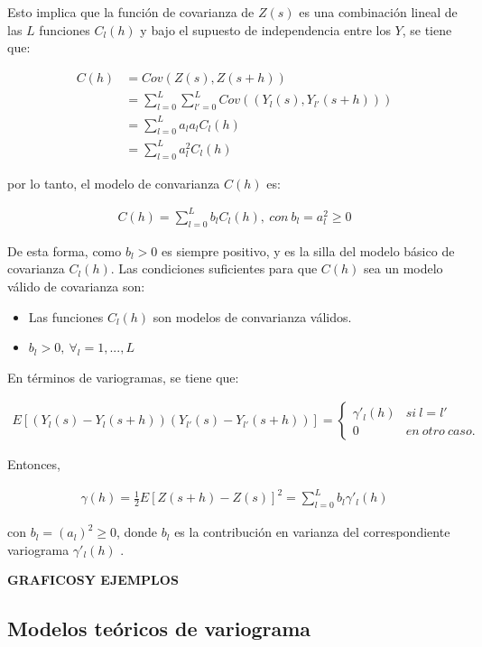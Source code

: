\documentclass[
]{book}
\providecommand{\tightlist}{%
  \setlength{\itemsep}{0pt}\setlength{\parskip}{0pt}}
\begin{document}
Esto implica que la función de covarianza de \(Z(s)\) es una combinación lineal de las \(L\) funciones \(C_l(h)\) y bajo el supuesto de independencia entre los \(Y\), se tiene que:

\begin{align*}
    C(h)&=Cov(Z(s),Z(s+h))\\
    &= \sum_{l=0}^L\sum_{l'=0}^L Cov((Y_l(s),Y_{l'}(s+h))) \\
    &=\sum_{l=0}^La_la_lC_l(h)\\
    &=\sum_{l=0}^La_l^2C_l(h)
\end{align*}

por lo tanto, el modelo de convarianza \(C(h)\) es:

\begin{align*}
  C(h)=\sum_{l=0}^Lb_lC_l(h),\ con\ b_l=a_l^2\geq 0  
\end{align*}

De esta forma, como \(b_l>0\) es siempre positivo, y es la silla del modelo básico de covarianza \(C_l(h)\). Las condiciones suficientes para que \(C(h)\) sea un modelo válido de covarianza son:

\begin{itemize}
\tightlist
\item
  Las funciones \(C_l(h)\) son modelos de convarianza válidos.
\item
  \(b_l>0,\ \forall_l=1,...,L\)
\end{itemize}

En términos de variogramas, se tiene que:

\begin{align*}
  E\left[ (Y_l(s)-Y_l(s+h))(Y_{l'}(s)-Y_{l'}(s+h))  \right]=\left \{ \begin{matrix} \gamma'_l(h) & si\ l=l'\\ 
0 & en\ otro\ caso. 
\end{matrix}\right.    
\end{align*}

Entonces,

\begin{align*}
   \gamma(h)=\frac{1}{2} E[Z(s+h)-Z(s)]^2=\sum_{l=0}^Lb_l\gamma'_l(h) 
\end{align*}

con \(b_l=(a_l)^2\geq 0\), donde \(b_l\) es la contribución en varianza del correspondiente variograma \(\gamma'_l(h)\) \citep{marta}.

\textbf{GRAFICOSY EJEMPLOS}

\hypertarget{modelos-teuxf3ricos-de-variograma}{%
\subsection{Modelos teóricos de variograma}\label{modelos-teuxf3ricos-de-variograma}}
\end{document}
